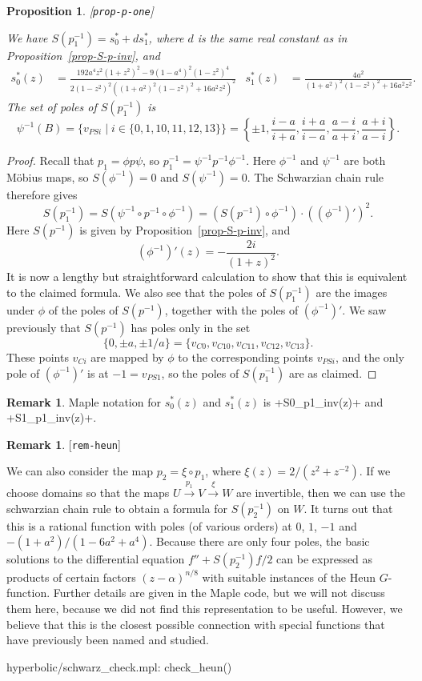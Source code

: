 \documentclass[reqno]{amsart}
\newcommand{\lbl}[1]{\label{#1}\textup{[\texttt{#1}]}\par}
\newcommand{\lbl}{\label}
\newcommand{\al}        {\alpha}
\newcommand{\xra}       {\xrightarrow}
\newcommand{\st}        {\;|\;}
\renewcommand{\:}{\colon}
\newtheorem{proposition}[theorem]{Proposition}
\theoremstyle{definition}
\newtheorem{remark}[theorem]{Remark}
\begin{document}
\begin{proposition}\lbl{prop-p-one}
 We have $S(p_1^{-1})=s^*_0+ds^*_1$, where $d$ is the same real
 constant as in Proposition~\ref{prop-S-p-inv}, and
 \begin{align*}
  s^*_0(z) &= \frac{192a^4z^2(1+z^2)^2-9(1-a^4)^2(1-z^2)^4}{
                    2(1-z^2)^2((1+a^2)^2(1-z^2)^2+16a^2z^2)^2} &
  s^*_1(z) &= \frac{4a^2}{(1+a^2)^2(1-z^2)^2+16a^2z^2}.
 \end{align*}
 The set of poles of $S(p_1^{-1})$ is
 \[ \psi^{-1}(B) = \{v_{PSi}\st i\in\{0,1,10,11,12,13\}\} =
     \left\{\pm 1,
            \frac{i-a}{i+a},\frac{i+a}{i-a},
            \frac{a-i}{a+i},\frac{a+i}{a-i}\right\}.
 \]
\end{proposition}
\begin{proof}
 Recall that $p_1=\phi p\psi$, so $p_1^{-1}=\psi^{-1}p^{-1}\phi^{-1}$.
 Here $\phi^{-1}$ and $\psi^{-1}$ are both M\"obius maps, so
 $S(\phi^{-1})=0$ and $S(\psi^{-1})=0$.  The Schwarzian chain rule
 therefore gives
 \[ S(p_1^{-1}) =
    S(\psi^{-1}\circ p^{-1}\circ\phi^{-1}) =
    (S(p^{-1})\circ\phi^{-1}) \cdot ((\phi^{-1})')^2.
 \]
 Here $S(p^{-1})$ is given by Proposition~\ref{prop-S-p-inv}, and
 \[ (\phi^{-1})'(z) = -\frac{2i}{(1+z)^2}. \]
 It is now a lengthy but straightforward calculation to show that this
 is equivalent to the claimed formula.  We also see that the poles of
 $S(p_1^{-1})$ are the images under $\phi$ of the poles of
 $S(p^{-1})$, together with the poles of $(\phi^{-1})'$.  We saw
 previously that $S(p^{-1})$ has poles only in the set
 \[ \{0,\pm a,\pm 1/a\}=\{v_{C0},v_{C10},v_{C11},v_{C12},v_{C13}\}.
 \]
 These points $v_{Ci}$ are mapped by $\phi$ to the corresponding
 points $v_{PSi}$, and the only pole of $(\phi^{-1})'$ is at
 $-1=v_{PS1}$, so the poles of $S(p_1^{-1})$ are as claimed.
\end{proof}

\begin{remark}
 Maple notation for $s_0^*(z)$ and $s_1^*(z)$ is \mcode+S0_p1_inv(z)+
 and \mcode+S1_p1_inv(z)+.
\end{remark}
\begin{remark}\lbl{rem-heun}
 We can also consider the map $p_2=\xi\circ p_1$, where
 $\xi(z)=2/(z^2+z^{-2})$.  If we choose domains so that the maps
 $U\xra{p_1}V\xra{\xi}W$ are invertible, then we can use the
 schwarzian chain rule to obtain a formula for $S(p_2^{-1})$ on $W$.
 It turns out that this is a rational function with poles (of various
 orders) at $0$, $1$, $-1$ and $-(1+a^2)/(1-6a^2+a^4)$.  Because there
 are only four poles, the basic solutions to the differential equation
 $f''+S(p_2^{-1})f/2$ can be expressed as products of certain factors
 $(z-\al)^{n/8}$ with suitable instances of the Heun $G$-function.
 Further details are given in the Maple code, but we will not discuss
 them here, because we did not find this representation to be useful.
 However, we believe that this is the closest possible connection with
 special functions that have previously been named and studied.
 \begin{checks}
  hyperbolic/schwarz_check.mpl: check_heun()
 \end{checks}
\end{remark}
\end{document}
